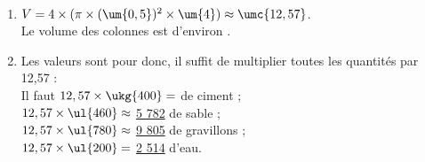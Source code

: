    \ \\ [-5mm]
   \begin{enumerate}
      \item $V =4\times(\pi\times(\um{0,5})^2\times\um{4}) \approx \umc{12,57}$. \\
         {\blue Le volume des colonnes est d'environ }.
      \item Les valeurs sont pour  donc, il suffit de multiplier toutes les quantités par 12,57 : \\
         Il faut $12,57\times\ukg{400} =$ {\blue {} de ciment} ; \\
         $12,57\times\ul{460} \approx$ {\blue \ul{5 782} de sable} ; \\
         $12,57\times\ul{780} \approx$ {\blue \ul{9 805} de gravillons} ; \\
         $12,57\times\ul{200} =$ {\blue \ul{2 514} d'eau}.
   \end{enumerate}
